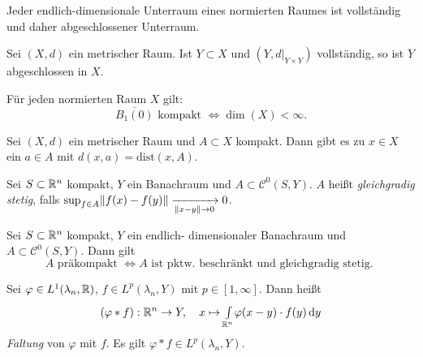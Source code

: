\documentclass{cheat-sheet}
\newcommand{\dist}{\mathrm{dist}} %
\begin{document}
\begin{lem}
  Jeder endlich-dimensionale Unterraum eines normierten Raumes ist vollständig und daher abgeschlossener Unterraum.
\end{lem}

\begin{lem}
  Sei $(X, d)$ ein metrischer Raum. Ist $Y \subset X$ und $(Y, d|_{Y \times Y})$ vollständig, so ist $Y$ abgeschlossen in $X$.
\end{lem}

\begin{satz}
  Für jeden normierten Raum $X$ gilt:
  \[ \overline{B_1(0)} \text{ kompakt } \iff \dim(X) < \infty. \]
\end{satz}


\begin{satz}
  Sei $(X, d)$ ein metrischer Raum und $A \subset X$ kompakt. Dann gibt es zu $x \in X$ ein $a \in A$ mit $d(x, a) = \dist(x, A)$.
\end{satz}

\begin{defn}
  Sei $S \subset \mathbb{R}^n$ kompakt, $Y$ ein Banachraum und $A \subset \mathcal{C}^0(S, Y)$.
  $A$ heißt \emph{gleichgradig stetig}, falls $\sup_{f \in A} \lVert f(x) - f(y)\rVert \xrightarrow[\lVert x - y\rVert \to 0]{} 0$.
\end{defn}

\begin{satz}
  Sei $S \subset \mathbb{R}^n$ kompakt, $Y$ ein endlich- dimensionaler Banachraum und $A \subset \mathcal{C}^0(S, Y)$. Dann gilt
  \[ A \text{ präkompakt } \iff A \text{ ist pktw. beschränkt und gleichgradig stetig. } \]
\end{satz}




\begin{defn}
  Sei $\varphi \in L^1(\lambda_n, \mathbb{R})$, $f \in L^p(\lambda_n, Y)$ mit $p \in \left[ 1, \infty \right]$. Dann heißt
  \[ (\varphi * f) : \mathbb{R}^n \to Y, \quad x \mapsto {\textstyle \int\limits_{\mathbb{R}^n}^{}} \varphi(x - y) \cdot f(y) \,\mathrm{d} y \]
  \emph{Faltung} von $\varphi$ mit $f$. Es gilt $\varphi * f \in L^p(\lambda_n, Y)$.
\end{defn}
\end{document}
